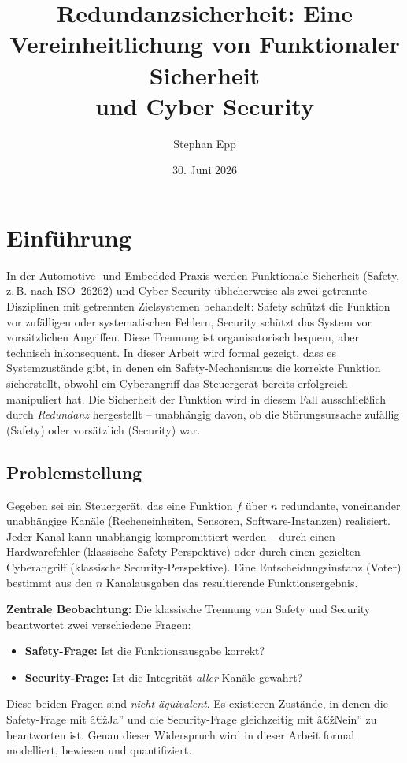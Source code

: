 ﻿\documentclass[a4paper,12pt]{article}
\title{Redundanzsicherheit: Eine Vereinheitlichung von Funktionaler Sicherheit\\ und Cyber Security}
\author{Stephan Epp}
\date{30. Juni 2026}
\theoremstyle{definition}
\begin{document}
\maketitle

\tableofcontents
\newpage

\section{Einführung}

In der Automotive- und Embedded-Praxis werden Funktionale Sicherheit (Safety, z.\,B. nach ISO~26262) und Cyber Security üblicherweise als zwei getrennte Disziplinen mit getrennten Zielsystemen behandelt: Safety schützt die Funktion vor zufälligen oder systematischen Fehlern, Security schützt das System vor vorsätzlichen Angriffen. Diese Trennung ist organisatorisch bequem, aber technisch inkonsequent. In dieser Arbeit wird formal gezeigt, dass es Systemzustände gibt, in denen ein Safety-Mechanismus die korrekte Funktion sicherstellt, obwohl ein Cyberangriff das Steuergerät bereits erfolgreich manipuliert hat. Die Sicherheit der Funktion wird in diesem Fall ausschließlich durch \emph{Redundanz} hergestellt -- unabhängig davon, ob die Störungsursache zufällig (Safety) oder vorsätzlich (Security) war.

\subsection{Problemstellung}

Gegeben sei ein Steuergerät, das eine Funktion $f$ über $n$ redundante, voneinander unabhängige Kanäle (Recheneinheiten, Sensoren, Software-Instanzen) realisiert. Jeder Kanal kann unabhängig kompromittiert werden -- durch einen Hardwarefehler (klassische Safety-Perspektive) oder durch einen gezielten Cyberangriff (klassische Security-Perspektive). Eine Entscheidungsinstanz (Voter) bestimmt aus den $n$ Kanalausgaben das resultierende Funktionsergebnis.

\textbf{Zentrale Beobachtung:} Die klassische Trennung von Safety und Security beantwortet zwei verschiedene Fragen:
\begin{itemize}
	\item \textbf{Safety-Frage:} Ist die Funktionsausgabe korrekt?
	\item \textbf{Security-Frage:} Ist die Integrität \emph{aller} Kanäle gewahrt?
\end{itemize}

Diese beiden Fragen sind \emph{nicht äquivalent}. Es existieren Zustände, in denen die Safety-Frage mit â€žJa'' und die Security-Frage gleichzeitig mit â€žNein'' zu beantworten ist. Genau dieser Widerspruch wird in dieser Arbeit formal modelliert, bewiesen und quantifiziert.
\end{document}
